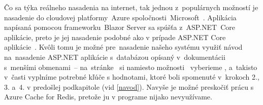 Čo sa týka reálneho nasadenia na internet, tak jednou z~populárnych možností je nasadenie do cloudovej platformy~Azure spoločnosti~Microsoft~\cite{azure}. Aplikácia napísaná pomocou frameworku~Blazor Server sa spúšťa z~ASP.NET~Core aplikácie, preto je jej nasadenie podobné ako v prípade ASP.NET Core aplikácie~\cite{blazorserveraspnet}. Kvôli tomu je možné pre~nasadenie našeho systému využiť návod na~nasadenie ASP.NET aplikácie s~databázou opísaný v~dokumentácii~\cite{deploy} s~menšími obmenami~-- na~stránke~ si namiesto možnosti~ vyberieme , a~takisto v~časti  vyplníme potrebné kľúče s hodnotami, ktoré boli spomenuté v~krokoch 2., 3. a~4. v predošlej podkapitole (vid \ref{navod}). Navyše je možné preskočiť prácu s Azure Cache for Redis, pretože ju v programe nijako nevyužívame.
